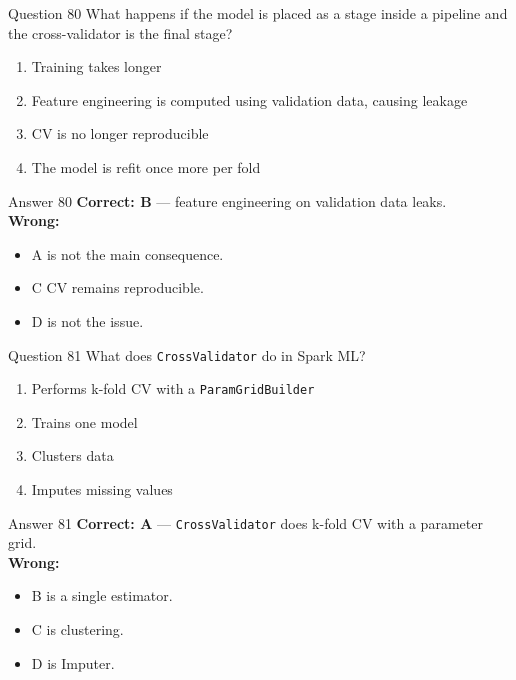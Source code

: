 \documentclass[aspectratio=169,11pt]{beamer}
\begin{document}
	\begin{frame}{Question 80}
		What happens if the model is placed as a stage inside a pipeline and the cross-validator is the final stage?
		\begin{enumerate}[label=\Alph*.]
			\item Training takes longer
			\item Feature engineering is computed using validation data, causing leakage
			\item CV is no longer reproducible
			\item The model is refit once more per fold
		\end{enumerate}
	\end{frame}
	\begin{frame}{Answer 80}
		\textbf{Correct: B} --- feature engineering on validation data leaks.\\
		\vspace{0.5em}
		\textbf{Wrong:}
		\begin{itemize}
			\item A is not the main consequence.
			\item C CV remains reproducible.
			\item D is not the issue.
		\end{itemize}
	\end{frame}
	
	\begin{frame}{Question 81}
		What does \texttt{CrossValidator} do in Spark ML?
		\begin{enumerate}[label=\Alph*.]
			\item Performs k-fold CV with a \texttt{ParamGridBuilder}
			\item Trains one model
			\item Clusters data
			\item Imputes missing values
		\end{enumerate}
	\end{frame}
	\begin{frame}{Answer 81}
		\textbf{Correct: A} --- \texttt{CrossValidator} does k-fold CV with a parameter grid.\\
		\vspace{0.5em}
		\textbf{Wrong:}
		\begin{itemize}
			\item B is a single estimator.
			\item C is clustering.
			\item D is Imputer.
		\end{itemize}
	\end{frame}
	
\end{document}
